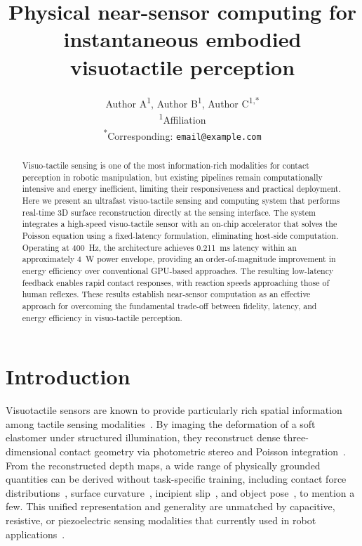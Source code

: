 \documentclass[10pt,a4paper]{article}
\title{Physical near-sensor computing for instantaneous embodied visuotactile perception}
\author{Author A\textsuperscript{1},
        Author B\textsuperscript{1},
        Author C\textsuperscript{1,*}\\[4pt]
        \small\textsuperscript{1}Affiliation\\
        \small\textsuperscript{*}Corresponding: \texttt{email@example.com}}
\date{}
\begin{document}
\maketitle

\begin{abstract}
Visuo-tactile sensing is one of the most information-rich modalities for contact perception in robotic manipulation, but existing pipelines remain computationally intensive and energy inefficient, limiting their responsiveness and practical deployment. 
Here we present an ultrafast visuo-tactile sensing and computing system that performs real-time 3D surface reconstruction directly at the sensing interface. The system integrates a high-speed visuo-tactile sensor with an on-chip accelerator that solves the Poisson equation using a fixed-latency formulation, eliminating host-side computation. 
Operating at 400~Hz, the architecture achieves 0.211~ms latency within an approximately 4~W power envelope, providing an order-of-magnitude improvement in energy efficiency over conventional GPU-based approaches. 
The resulting low-latency feedback enables rapid contact responses, with reaction speeds approaching those of human reflexes. 
These results establish near-sensor computation as an effective approach for overcoming the fundamental trade-off between fidelity, latency, and energy efficiency in visuo-tactile perception.
\end{abstract}

\section*{Introduction}

Visuotactile sensors are known to provide particularly rich spatial information among tactile sensing modalities~\cite{yuan2017gelsight,lambeta2020digit,taylor2022gelslim3,li2024signalprocessing,luo2025tactilerobotics}. By imaging the deformation of a soft elastomer under structured illumination, they reconstruct dense three-dimensional contact geometry via photometric stereo and Poisson integration~\cite{yuan2017gelsight,li2014gelsight}. From the reconstructed depth maps, a wide range of physically grounded quantities can be derived without task-specific training, including contact force distributions~\cite{ma2019densetactile}, surface curvature~\cite{lin2023_9dtact}, incipient slip~\cite{dong2017improved}, and object pose~\cite{suresh2024neuralfeels,zhao2026gelslam}, to mention a few. This unified representation and generality are unmatched by capacitive, resistive, or piezoelectric sensing modalities that currently used in robot applications~\cite{chen2025capacitive,li2024signalprocessing}.
\end{document}
